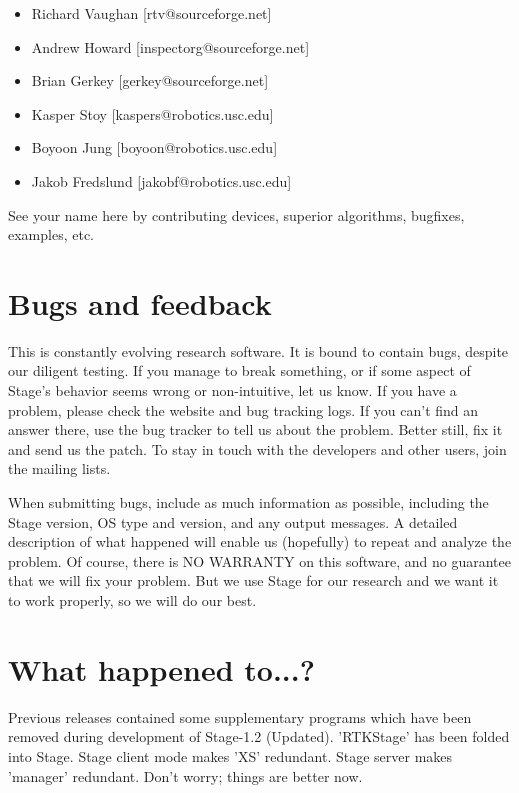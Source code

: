 \documentclass[11pt,twoside]{report}
\def\VERSION {1.2 (Updated)}
\begin{document}
      \begin{itemize}
      \item[] Richard Vaughan [rtv@sourceforge.net]
      \item[] Andrew Howard [inspectorg@sourceforge.net]
      \item[] Brian Gerkey [gerkey@sourceforge.net]
      \item[] Kasper Stoy [kaspers@robotics.usc.edu]
      \item[] Boyoon Jung [boyoon@robotics.usc.edu]
      \item[] Jakob Fredslund [jakobf@robotics.usc.edu]
      \end{itemize}

	See your name here by contributing devices, superior
	algorithms, bugfixes, examples, etc.

  \section{Bugs and feedback}
  
    This is constantly evolving research software. It is bound to
    contain bugs, despite our diligent testing.  If you manage to
    break something, or if some aspect of Stage's behavior seems wrong
    or non-intuitive, let us know. If you have a problem, please check
    the website and bug tracking logs. If you can't find an answer
    there, use the bug tracker to tell us about the problem. Better
    still, fix it and send us the patch. To stay in touch with the
    developers and other users, join the mailing lists.

    When submitting bugs, include as much information as possible,
    including the Stage version, OS type and version, and any output
    messages.  A detailed description of what happened will enable us
    (hopefully) to repeat and analyze the problem.  Of course, there
    is NO WARRANTY on this software, and no guarantee that we will fix
    your problem.  But we use Stage for our research and we want it to
    work properly, so we will do our best.

  \section{What happened to...?}
	
	Previous releases contained some supplementary programs which
	have been removed during development of
	Stage-\VERSION. 'RTKStage' has been folded into Stage. Stage
	client mode makes 'XS' redundant. Stage server makes 'manager'
	redundant. Don't worry; things are better now.
\end{document}
